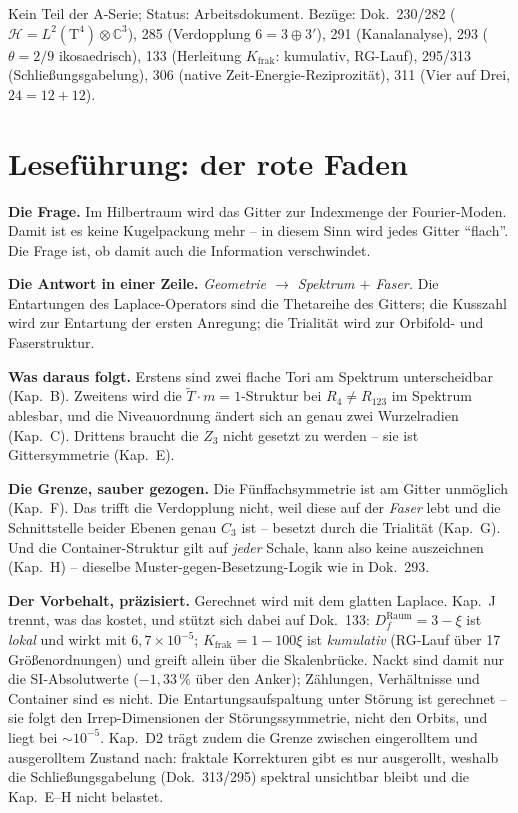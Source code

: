 \documentclass[11pt]{report}
\begin{document}
Kein Teil der A-Serie; Status: Arbeitsdokument. Bezüge: Dok.~230/282
($\mathcal{H} = L^2(\text{T}^4)\otimes\mathbb{C}^3$), 285
(Verdopplung $6 = 3\oplus3'$), 291 (Kanalanalyse), 293
($\theta = 2/9$ ikosaedrisch), 133 (Herleitung $K_\text{frak}$: kumulativ, RG-Lauf),
295/313 (Schließungsgabelung), 306 (native
Zeit-Energie-Reziprozität), 311 (Vier auf Drei, $24 = 12+12$).

\section*{Leseführung: der rote Faden}

\textbf{Die Frage.} Im Hilbertraum wird das Gitter zur Indexmenge
der Fourier-Moden. Damit ist es keine Kugelpackung mehr -- in diesem
Sinn wird jedes Gitter \enquote{flach}. Die Frage ist, ob damit auch
die Information verschwindet.

\textbf{Die Antwort in einer Zeile.} \emph{Geometrie $\to$ Spektrum
$+$ Faser.} Die Entartungen des Laplace-Operators sind die
Thetareihe des Gitters; die Kusszahl wird zur Entartung der ersten
Anregung; die Trialität wird zur Orbifold- und Faserstruktur.

\textbf{Was daraus folgt.} Erstens sind zwei flache Tori am
Spektrum unterscheidbar (Kap.~B). Zweitens wird die
$\tilde T\cdot m = 1$-Struktur bei $R_4 \ne R_{123}$ im Spektrum
ablesbar, und die Niveauordnung ändert sich an genau zwei
Wurzelradien (Kap.~C). Drittens braucht die $Z_3$ nicht gesetzt zu
werden -- sie ist Gittersymmetrie (Kap.~E).

\textbf{Die Grenze, sauber gezogen.} Die Fünffachsymmetrie ist am
Gitter unmöglich (Kap.~F). Das trifft die Verdopplung nicht, weil
diese auf der \emph{Faser} lebt und die Schnittstelle beider Ebenen
genau $C_3$ ist -- besetzt durch die Trialität (Kap.~G). Und die
Container-Struktur gilt auf \emph{jeder} Schale, kann also keine
auszeichnen (Kap.~H) -- dieselbe Muster-gegen-Besetzung-Logik wie in
Dok.~293.

\textbf{Der Vorbehalt, präzisiert.} Gerechnet wird mit dem glatten
Laplace. Kap.~J trennt, was das kostet, und stützt sich dabei auf
Dok.~133: $D_f^\text{Raum} = 3-\xi$ ist \emph{lokal} und wirkt mit
$6{,}7\times10^{-5}$; $K_\text{frak} = 1-100\xi$ ist
\emph{kumulativ} (RG-Lauf über 17 Größenordnungen) und greift
allein über die Skalenbrücke. Nackt sind damit nur die
SI-Absolutwerte ($-1{,}33\,\%$ über den Anker); Zählungen,
Verhältnisse und Container sind es nicht. Die Entartungsaufspaltung
unter Störung ist gerechnet -- sie folgt den Irrep-Dimensionen der
Störungssymmetrie, nicht den Orbits, und liegt bei $\sim10^{-5}$. Kap.~D2 trägt zudem die Grenze zwischen eingerolltem und
ausgerolltem Zustand nach: fraktale Korrekturen gibt es nur
ausgerollt, weshalb die Schließungsgabelung (Dok.~313/295)
spektral unsichtbar bleibt und die Kap.~E--H nicht belastet.
\end{document}
